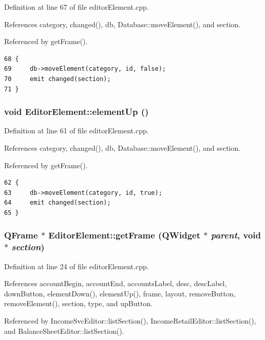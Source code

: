 Definition at line 67 of file editor\-Element.cpp.

References category, changed(), db, Database::move\-Element(), and section.

Referenced by get\-Frame().

\footnotesize\begin{verbatim}68 {
69     db->moveElement(category, id, false);
70     emit changed(section);
71 }
\end{verbatim}\normalsize 


\hypertarget{classEditorElement_k0}{
\subsubsection[elementUp]{\setlength{\rightskip}{0pt plus 5cm}void Editor\-Element::element\-Up ()}}
\label{classEditorElement_k0}


Definition at line 61 of file editor\-Element.cpp.

References category, changed(), db, Database::move\-Element(), and section.

Referenced by get\-Frame().

\footnotesize\begin{verbatim}62 {
63     db->moveElement(category, id, true);
64     emit changed(section);
65 }
\end{verbatim}\normalsize 


\hypertarget{classEditorElement_a2}{
\subsubsection[getFrame]{\setlength{\rightskip}{0pt plus 5cm}QFrame $\ast$ Editor\-Element::get\-Frame (QWidget $\ast$ {\em parent}, void $\ast$ {\em section})}}
\label{classEditorElement_a2}


Definition at line 24 of file editor\-Element.cpp.

References account\-Begin, account\-End, accounts\-Label, desc, desc\-Label, down\-Button, element\-Down(), element\-Up(), frame, layout, remove\-Button, remove\-Element(), section, type, and up\-Button.

Referenced by Income\-Svc\-Editor::list\-Section(), Income\-Retail\-Editor::list\-Section(), and Balance\-Sheet\-Editor::list\-Section().

